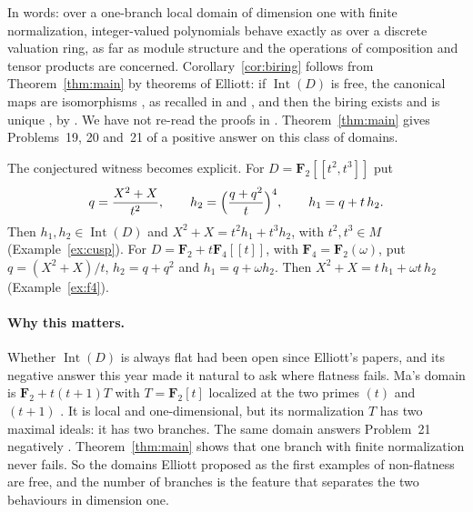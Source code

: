 \documentclass[11pt,a4paper]{article}
\theoremstyle{plain}
\theoremstyle{remark}
\newcommand{\F}{\mathbf F}
\newcommand{\Int}{\operatorname{Int}}
\begin{document}
In words: over a one-branch local domain of dimension one with finite normalization, integer-valued polynomials
behave exactly as over a discrete valuation ring, as far as module structure and the operations of composition and
tensor products are concerned. Corollary~\ref{cor:biring} follows from Theorem~\ref{thm:main} by theorems of Elliott:
if $\Int(D)$ is free, the canonical maps are isomorphisms \cite[Propositions~6.8(a), 6.10(d)]{E07}, as recalled in
\cite[p.~9]{CFFG} and \cite[p.~16]{E11b}, and then the biring exists and is unique \cite[p.~10]{CFFG}, by
\cite{E10}. We have not re-read the proofs in \cite{E07,E10}. Theorem~\ref{thm:main} gives Problems~19, 20 and~21
of \cite{CFFG} a positive answer on this class of domains.

The conjectured witness becomes explicit. For $D=\F_2[[t^2,t^3]]$ put
\[
 q=\frac{X^2+X}{t^2},\qquad h_2=\Bigl(\frac{q+q^2}{t}\Bigr)^4,\qquad h_1=q+t\,h_2 .
\]
Then $h_1,h_2\in\Int(D)$ and $X^2+X=t^2h_1+t^3h_2$, with $t^2,t^3\in M$ (Example~\ref{ex:cusp}). For
$D=\F_2+t\F_4[[t]]$, with $\F_4=\F_2(\omega)$, put $q=(X^2+X)/t$, $h_2=q+q^2$ and $h_1=q+\omega h_2$. Then
$X^2+X=t\,h_1+\omega t\,h_2$ (Example~\ref{ex:f4}).

\paragraph{Why this matters.}
Whether $\Int(D)$ is always flat had been open since Elliott's papers, and its negative answer this year
\cite{Ma} made it natural to ask where flatness fails. Ma's domain is $\F_2+t(t+1)T$ with $T=\F_2[t]$ localized at
the two primes $(t)$ and $(t+1)$ \cite[\S3]{Ma}. It is local and one-dimensional, but its normalization $T$ has two
maximal ideals: it has two branches. The same domain answers Problem~21 negatively \cite[Theorem~3.4]{JLSWXY}.
Theorem~\ref{thm:main} shows that one branch with finite normalization never fails. So the domains Elliott proposed
as the first examples of non-flatness are free, and the number of branches is the feature that separates the two
behaviours in dimension one.
\end{document}
